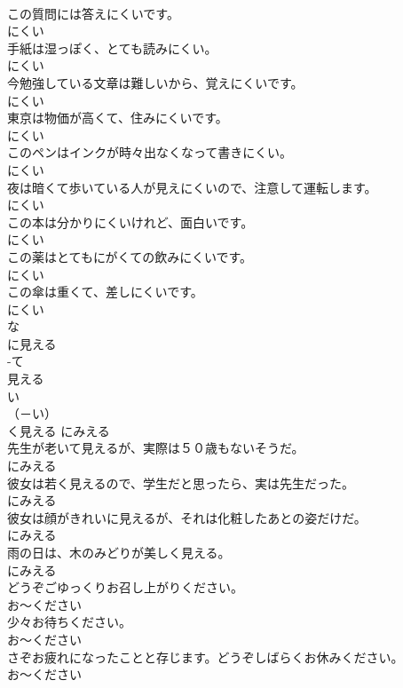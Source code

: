 \documentclass[8pt]{extreport}
\begin{document}
\begin{CJK}{UTF8}{min}
\\	この質問には答えにくいです。	
\\	にくい	
\\	手紙は湿っぽく、とても読みにくい。	
\\	にくい	
\\	今勉強している文章は難しいから、覚えにくいです。	
\\	にくい	
\\	東京は物価が高くて、住みにくいです。	
\\	にくい	
\\	このペンはインクが時々出なくなって書きにくい。	
\\	にくい	
\\	夜は暗くて歩いている人が見えにくいので、注意して運転します。	
\\	にくい	
\\	この本は分かりにくいけれど、面白いです。	
\\	にくい	
\\	この薬はとてもにがくての飲みにくいです。	
\\	にくい	
\\	この傘は重くて、差しにくいです。	
\\	にくい	
\\	な
\\	に見える	
\\	-て
\\	見える	
\\	い
\\	（－い） 
\\	く見える	にみえる	
\\	先生が老いて見えるが、実際は５０歳もないそうだ。	
\\	にみえる	
\\	彼女は若く見えるので、学生だと思ったら、実は先生だった。	
\\	にみえる	
\\	彼女は顔がきれいに見えるが、それは化粧したあとの姿だけだ。	
\\	にみえる	
\\	雨の日は、木のみどりが美しく見える。	
\\	にみえる	
\\	どうぞごゆっくりお召し上がりください。	
\\	お～ください	
\\	少々お待ちください。	
\\	お～ください	
\\	さぞお疲れになったことと存じます。どうぞしばらくお休みください。	
\\	お～ください	

\end{CJK}
\end{document}
